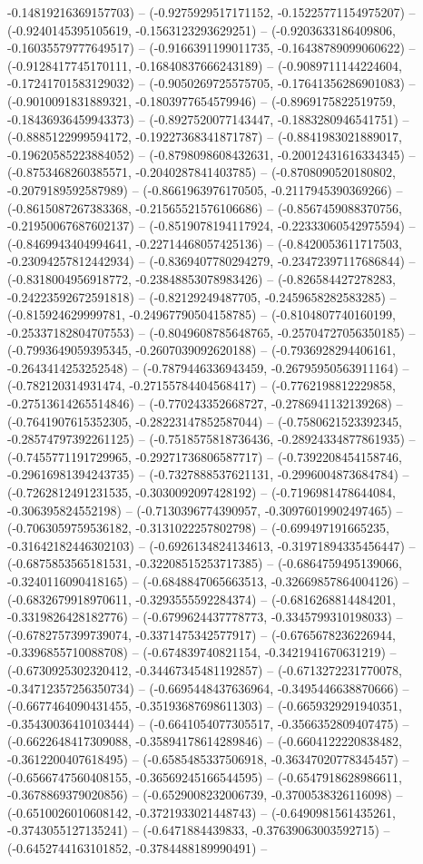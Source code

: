 -0.14819216369157703) -- (-0.9275929517171152, -0.15225771154975207) -- (-0.9240145395105619, -0.1563123293629251) -- (-0.9203633186409806, -0.16035579777649517) -- (-0.9166391199011735, -0.16438789099060622) -- (-0.9128417745170111, -0.16840837666243189) -- (-0.9089711144224604, -0.17241701583129032) -- (-0.9050269725575705, -0.17641356286901083) -- (-0.9010091831889321, -0.1803977654579946) -- (-0.8969175822519759, -0.18436936459943373) -- (-0.8927520077143447, -0.1883280946541751) -- (-0.8885122999594172, -0.19227368341871787) -- (-0.8841983021889017, -0.19620585223884052) -- (-0.8798098608432631, -0.20012431616334345) -- (-0.8753468260385571, -0.2040287841403785) -- (-0.8708090520180802, -0.2079189592587989) -- (-0.8661963976170505, -0.2117945390369266) -- (-0.8615087267383368, -0.21565521576106686) -- (-0.8567459088370756, -0.21950067687602137) -- (-0.8519078194117924, -0.22333060542975594) -- (-0.8469943404994641, -0.22714468057425136) -- (-0.8420053611717503, -0.23094257812442934) -- (-0.8369407780294279, -0.23472397117686844) -- (-0.8318004956918772, -0.23848853078983426) -- (-0.826584427278283, -0.24223592672591818) -- (-0.82129249487705, -0.2459658282583285) -- (-0.815924629999781, -0.24967790504158785) -- (-0.8104807740160199, -0.25337182804707553) -- (-0.8049608785648765, -0.25704727056350185) -- (-0.7993649059395345, -0.2607039092620188) -- (-0.7936928294406161, -0.2643414253252548) -- (-0.7879446336943459, -0.26795950563911164) -- (-0.782120314931474, -0.27155784404568417) -- (-0.7762198812229858, -0.27513614265514846) -- (-0.770243352668727, -0.2786941132139268) -- (-0.7641907615352305, -0.28223147852587044) -- (-0.7580621523392345, -0.28574797392261125) -- (-0.7518575818736436, -0.28924334877861935) -- (-0.7455771191729965, -0.29271736806587717) -- (-0.7392208454158746, -0.29616981394243735) -- (-0.7327888537621131, -0.2996004873684784) -- (-0.7262812491231535, -0.3030092097428192) -- (-0.7196981478644084, -0.306395824552198) -- (-0.7130396774390957, -0.30976019902497465) -- (-0.7063059759536182, -0.3131022257802798) -- (-0.699497191665235, -0.31642182446302103) -- (-0.6926134824134613, -0.31971894335456447) -- (-0.6875853565181531, -0.32208515253717385) -- (-0.6864759495139066, -0.3240116090418165) -- (-0.6848847065663513, -0.32669857864004126) -- (-0.6832679918970611, -0.3293555592284374) -- (-0.6816268814484201, -0.3319826428182776) -- (-0.6799624437778773, -0.3345799310198033) -- (-0.6782757399739074, -0.3371475342577917) -- (-0.6765678236226944, -0.3396855710088708) -- (-0.674839740821154, -0.3421941670631219) -- (-0.6730925302320412, -0.34467345481192857) -- (-0.6713272231770078, -0.34712357256350734) -- (-0.6695448437636964, -0.3495446638870666) -- (-0.6677464090431455, -0.35193687698611303) -- (-0.6659329291940351, -0.35430036410103444) -- (-0.6641054077305517, -0.3566352809407475) -- (-0.6622648417309088, -0.35894178614289846) -- (-0.6604122220838482, -0.3612200407618495) -- (-0.6585485337506918, -0.36347020778345457) -- (-0.6566747560408155, -0.36569245166544595) -- (-0.6547918628986611, -0.3678869379020856) -- (-0.6529008232006739, -0.3700538326116098) -- (-0.6510026010608142, -0.3721933021448743) -- (-0.6490981561435261, -0.3743055127135241) -- (-0.6471884439833, -0.37639063003592715) -- (-0.6452744163101852, -0.3784488189990491) -- 
